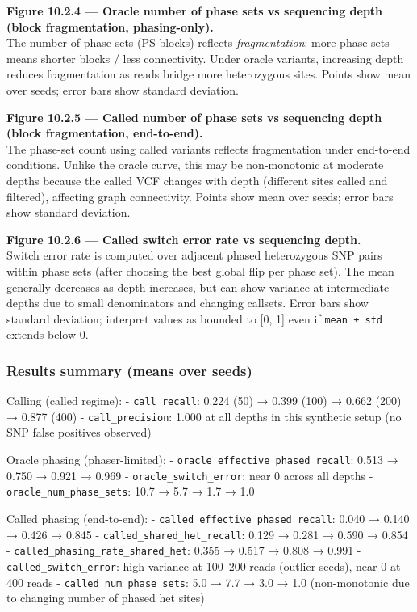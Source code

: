 \documentclass[
]{article}
\begin{document}
\textbf{Figure 10.2.4 --- Oracle number of phase sets vs sequencing
depth (block fragmentation, phasing-only).}\\
The number of phase sets (PS blocks) reflects \emph{fragmentation}: more
phase sets means shorter blocks / less connectivity. Under oracle
variants, increasing depth reduces fragmentation as reads bridge more
heterozygous sites. Points show mean over seeds; error bars show
standard deviation.

\textbf{Figure 10.2.5 --- Called number of phase sets vs sequencing
depth (block fragmentation, end-to-end).}\\
The phase-set count using called variants reflects fragmentation under
end-to-end conditions. Unlike the oracle curve, this may be
non-monotonic at moderate depths because the called VCF changes with
depth (different sites called and filtered), affecting graph
connectivity. Points show mean over seeds; error bars show standard
deviation.

\textbf{Figure 10.2.6 --- Called switch error rate vs sequencing
depth.}\\
Switch error rate is computed over adjacent phased heterozygous SNP
pairs within phase sets (after choosing the best global flip per phase
set). The mean generally decreases as depth increases, but can show
variance at intermediate depths due to small denominators and changing
callsets. Error bars show standard deviation; interpret values as
bounded to {[}0, 1{]} even if \texttt{mean\ ±\ std} extends below 0.

\subsubsection{Results summary (means over
seeds)}\label{results-summary-means-over-seeds}

Calling (called regime): - \texttt{call\_recall}: 0.224 (50) → 0.399
(100) → 0.662 (200) → 0.877 (400) - \texttt{call\_precision}: 1.000 at
all depths in this synthetic setup (no SNP false positives observed)

Oracle phasing (phaser-limited): -
\texttt{oracle\_effective\_phased\_recall}: 0.513 → 0.750 → 0.921 →
0.969 - \texttt{oracle\_switch\_error}: near 0 across all depths -
\texttt{oracle\_num\_phase\_sets}: 10.7 → 5.7 → 1.7 → 1.0

Called phasing (end-to-end): -
\texttt{called\_effective\_phased\_recall}: 0.040 → 0.140 → 0.426 →
0.845 - \texttt{called\_shared\_het\_recall}: 0.129 → 0.281 → 0.590 →
0.854 - \texttt{called\_phasing\_rate\_shared\_het}: 0.355 → 0.517 →
0.808 → 0.991 - \texttt{called\_switch\_error}: high variance at
100--200 reads (outlier seeds), near 0 at 400 reads -
\texttt{called\_num\_phase\_sets}: 5.0 → 7.7 → 3.0 → 1.0 (non-monotonic
due to changing number of phased het sites)
\end{document}
